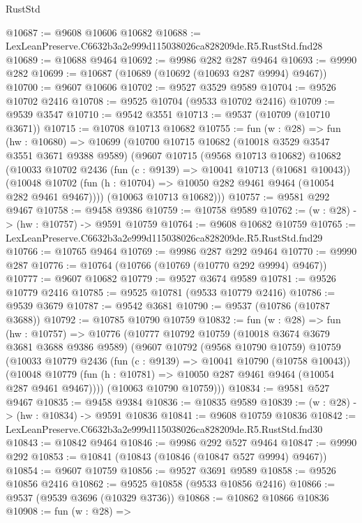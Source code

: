 \begin{lexlean}{RustStd}
\begin{coremodule}
@10687 := @9608 @10606 @10682
@10688 := LexLeanPreserve.C6632b3a2e999d115038026ca828209de.R5.RustStd.fnd28
@10689 := @10688 @9464
@10692 := @9986 @282 @287 @9464
@10693 := @9990 @282
@10699 := @10687 (@10689 (@10692 (@10693 @287 @9994) @9467))
@10700 := @9607 @10606
@10702 := @9527 @3529 @9589
@10704 := @9526 @10702 @2416
@10708 := @9525 @10704 (@9533 @10702 @2416)
@10709 := @9539 @3547
@10710 := @9542 @3551
@10713 := @9537 (@10709 (@10710 @3671))
@10715 := @10708 @10713 @10682
@10755 := fun (w : @28) =>
  fun (hw : @10680) =>
  @10699
    (@10700
      @10715
      @10682
      (@10018 @3529 @3547 @3551 @3671 @9388 @9589)
      (@9607
        @10715
        (@9568 @10713 @10682)
        @10682
        (@10033
          @10702
          @2436
          (fun (c : @9139) => @10041 @10713 (@10681 @10043))
          (@10048 @10702 (fun (h : @10704) => @10050 @282 @9461 @9464 (@10054 @282 @9461 @9467))))
        (@10063 @10713 @10682)))
@10757 := @9581 @292 @9467
@10758 := @9458 @9386
@10759 := @10758 @9589
@10762 := (w : @28) -> (hw : @10757) -> @9591 @10759
@10764 := @9608 @10682 @10759
@10765 := LexLeanPreserve.C6632b3a2e999d115038026ca828209de.R5.RustStd.fnd29
@10766 := @10765 @9464
@10769 := @9986 @287 @292 @9464
@10770 := @9990 @287
@10776 := @10764 (@10766 (@10769 (@10770 @292 @9994) @9467))
@10777 := @9607 @10682
@10779 := @9527 @3674 @9589
@10781 := @9526 @10779 @2416
@10785 := @9525 @10781 (@9533 @10779 @2416)
@10786 := @9539 @3679
@10787 := @9542 @3681
@10790 := @9537 (@10786 (@10787 @3688))
@10792 := @10785 @10790 @10759
@10832 := fun (w : @28) =>
  fun (hw : @10757) =>
  @10776
    (@10777
      @10792
      @10759
      (@10018 @3674 @3679 @3681 @3688 @9386 @9589)
      (@9607
        @10792
        (@9568 @10790 @10759)
        @10759
        (@10033
          @10779
          @2436
          (fun (c : @9139) => @10041 @10790 (@10758 @10043))
          (@10048 @10779 (fun (h : @10781) => @10050 @287 @9461 @9464 (@10054 @287 @9461 @9467))))
        (@10063 @10790 @10759)))
@10834 := @9581 @527 @9467
@10835 := @9458 @9384
@10836 := @10835 @9589
@10839 := (w : @28) -> (hw : @10834) -> @9591 @10836
@10841 := @9608 @10759 @10836
@10842 := LexLeanPreserve.C6632b3a2e999d115038026ca828209de.R5.RustStd.fnd30
@10843 := @10842 @9464
@10846 := @9986 @292 @527 @9464
@10847 := @9990 @292
@10853 := @10841 (@10843 (@10846 (@10847 @527 @9994) @9467))
@10854 := @9607 @10759
@10856 := @9527 @3691 @9589
@10858 := @9526 @10856 @2416
@10862 := @9525 @10858 (@9533 @10856 @2416)
@10866 := @9537 (@9539 @3696 (@10329 @3736))
@10868 := @10862 @10866 @10836
@10908 := fun (w : @28) =>

\end{coremodule}
\end{lexlean}
